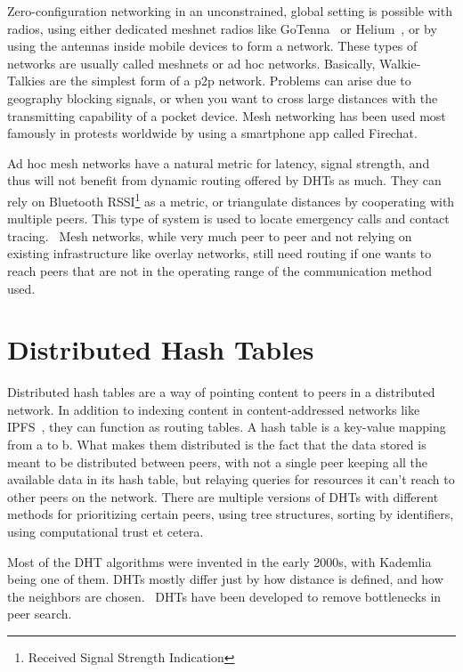 Zero-configuration networking in an unconstrained, global setting is possible with radios, using either dedicated meshnet radios like GoTenna~\cite{GoTenna_undated-km} or Helium~\cite{Helium_undated-jv}, or by using the antennas inside mobile devices to form a network. These types of networks are usually called meshnets or ad hoc networks. Basically, Walkie-Talkies are the simplest form of a p2p network. Problems can arise due to geography blocking signals, or when you want to cross large distances with the transmitting capability of a pocket device. Mesh networking has been used most famously in protests worldwide by using a smartphone app called Firechat.~\cite{Milian2014-mt}

Ad hoc mesh networks have a natural metric for latency, signal strength, and thus will not benefit from dynamic routing offered by DHTs as much. They can rely on Bluetooth RSSI\footnote{Received Signal Strength Indication} as a metric, or triangulate distances by cooperating with multiple peers. This type of system is used to locate emergency calls and contact tracing.~\cite{theintercept} Mesh networks, while very much peer to peer and not relying on existing infrastructure like overlay networks, still need routing if one wants to reach peers that are not in the operating range of the communication method used. 

\section{Distributed Hash Tables}
Distributed hash tables are a way of pointing content to peers in a distributed network. In addition to indexing content in content-addressed networks like IPFS~\cite{IPFS}, they can function as routing tables. A hash table is a key-value mapping from a to b. What makes them distributed is the fact that the data stored is meant to be distributed between peers, with not a single peer keeping all the available data in its hash table, but relaying queries for resources it can't reach to other peers on the network. There are multiple versions of DHTs with different methods for prioritizing certain peers, using tree structures, sorting by identifiers, using computational trust et cetera.

Most of the DHT algorithms were invented in the early 2000s, with Kademlia being one of them. DHTs mostly differ just by how distance is defined, and how the neighbors are chosen.~\cite{Cai2015-ra} DHTs have been developed to remove bottlenecks in peer search.
						
